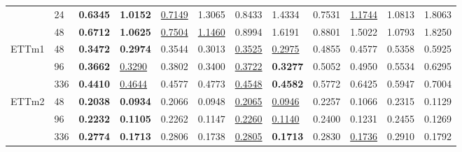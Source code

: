 \begin{small}
\begin{table}
{\begin{tabular}{p{10mm}p{8mm}p{8mm}p{8mm}p{8mm}p{8mm}p{8mm}p{8mm}p{8mm}p{8mm}p{8mm}p{8mm}}
                             & 24     & \textbf{0.6345}   & \textbf{1.0152}
                             & \underline{0.7149}       & 1.3065  & 0.8433    & 1.4334   & 0.7531  & \underline{1.1744}   & 1.0813   & 1.8063   \\
                             & 48     & \textbf{0.6712}  & \textbf{1.0625} &\underline{ 0.7504} & \underline{1.1460} & 0.8994        & 1.6191         & 0.8801   & 1.5022   & 1.0793 & 1.8250 \\
\midrule
\multirow{3}{*}{ETTm1}    & 48     & \textbf{0.3472}   & \textbf{0.2974}    & 0.3544  & 0.3013        & \underline{0.3525}& \underline{0.2975} & 0.4855    & 0.4577    & 0.5358   & 0.5925    \\
                             & 96     & \textbf{0.3662} & \underline{0.3290}   & 0.3802 & 0.3400 & \underline{0.3722} & \textbf{0.3277} & 0.5052 & 0.4950    & 0.5534   & 0.6295          \\
                             & 336     & \textbf{0.4410}   & \underline{0.4644}    & 0.4577         & 0.4773        & \underline{0.4548} & \textbf{0.4582} & 0.5772         & 0.6425   & 0.5947   & 0.7004    \\
\midrule
\multirow{3}{*}{ETTm2}     & 48     & \textbf{0.2038}   & \textbf{0.0934}   & 0.2066    & 0.0948    & \underline{0.2065}        & \underline{0.0946}       & 0.2257         & 0.1066         & 0.2315        & 0.1129        \\
                             & 96     & \textbf{0.2232 }        & \textbf{0.1105}        & 0.2262  & 0.1147        & \underline{0.2260}      & \underline{0.1140}        & 0.2400        & 0.1231        & 0.2455          & 0.1269         \\
                             & 336     & \textbf{0.2774}       & \textbf{0.1713}          & 0.2806 & 0.1738    & \underline{0.2805}       & \textbf{0.1713}       & 0.2830       & \underline{0.1736}    & 0.2910             & 0.1792 \\   
                             \bottomrule
\end{tabular}
}
\end{table}
\end{small}